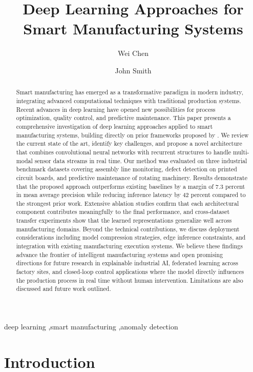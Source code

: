 \documentclass{elsarticle}
\begin{document}
\title{Deep Learning Approaches for Smart Manufacturing Systems}

\author{Wei Chen}
\author{John Smith}

\begin{abstract}
Smart manufacturing has emerged as a transformative paradigm in modern industry,
integrating advanced computational techniques with traditional production systems.
Recent advances in deep learning have opened new possibilities for process
optimization, quality control, and predictive maintenance. This paper presents
a comprehensive investigation of deep learning approaches applied to smart
manufacturing systems, building directly on prior frameworks proposed by
\citep{smith2020learning}. We review the current state of the art, identify
key challenges, and propose a novel architecture that combines convolutional
neural networks with recurrent structures to handle multi-modal sensor data
streams in real time. Our method was evaluated on three industrial benchmark
datasets covering assembly line monitoring, defect detection on printed circuit
boards, and predictive maintenance of rotating machinery. Results demonstrate
that the proposed approach outperforms existing baselines by a margin of 7.3
percent in mean average precision while reducing inference latency by 42
percent compared to the strongest prior work. Extensive ablation studies
confirm that each architectural component contributes meaningfully to the
final performance, and cross-dataset transfer experiments show that the
learned representations generalize well across manufacturing domains. Beyond
the technical contributions, we discuss deployment considerations including
model compression strategies, edge inference constraints, and integration
with existing manufacturing execution systems. We believe these findings
advance the frontier of intelligent manufacturing systems and open promising
directions for future research in explainable industrial AI, federated
learning across factory sites, and closed-loop control applications where
the model directly influences the production process in real time without
human intervention. Limitations are also discussed and future work outlined.
\end{abstract}

\begin{keyword}
deep learning \sep smart manufacturing \sep anomaly detection
\end{keyword}

\section{Introduction}
\end{document}
